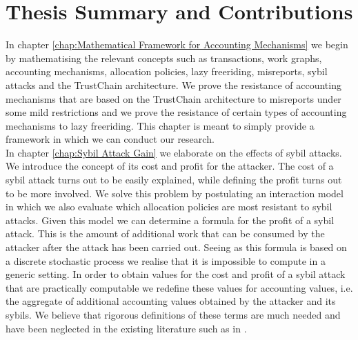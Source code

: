 \section{Thesis Summary and Contributions}
\label{sec:Thesis Summary and Contributions}
\noindent{}In chapter \ref{chap:Mathematical Framework for Accounting Mechanisms} we begin by mathematising the relevant concepts such as transactions, work graphs, accounting mechanisms, allocation policies, lazy freeriding, misreports, sybil attacks and the TrustChain architecture. We prove the resistance of accounting mechanisms that are based on the TrustChain architecture to misreports under some mild restrictions and we prove the resistance of certain types of accounting mechanisms to lazy freeriding. This chapter is meant to simply provide a framework in which we can conduct our research. \vspace{1em}\\

\noindent{}In chapter \ref{chap:Sybil Attack Gain} we elaborate on the effects of sybil attacks. We introduce the concept of its cost and profit for the attacker. The cost of a sybil attack turns out to be easily explained, while defining the profit turns out to be more involved. We solve this problem by postulating an interaction model in which we also evaluate which allocation policies are most resistant to sybil attacks. Given this model we can determine a formula for the profit of a sybil attack. This is the amount of additional work that can be consumed by the attacker after the attack has been carried out. Seeing as this formula is based on a discrete stochastic process we realise that it is impossible to compute in a generic setting. In order to obtain values for the cost and profit of a sybil attack that are practically computable we redefine these values for accounting values, i.e. the aggregate of additional accounting values obtained by the attacker and its sybils. We believe that rigorous definitions of these terms are much needed and have been neglected in the existing literature such as in \cite{On the Sybil-Proofness of Accounting Mechanisms}. \vspace{1em}\\

